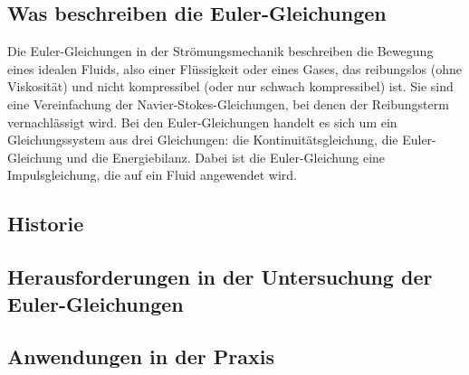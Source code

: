 \subsection{Was beschreiben die Euler-Gleichungen}

Die Euler-Gleichungen in der Strömungsmechanik beschreiben die Bewegung eines idealen Fluids, also einer Flüssigkeit oder eines Gases, das reibungslos (ohne Viskosität) und nicht kompressibel (oder nur schwach kompressibel) ist. Sie sind eine Vereinfachung der Navier-Stokes-Gleichungen, bei denen der Reibungsterm vernachlässigt wird. Bei den Euler-Gleichungen handelt es sich um ein Gleichungssystem aus drei Gleichungen: die Kontinuitätsgleichung, die Euler-Gleichung und die Energiebilanz. Dabei ist die Euler-Gleichung eine Impulsgleichung, die auf ein Fluid angewendet wird. 

\subsection{Historie}

\subsection{Herausforderungen in der Untersuchung der Euler-Gleichungen}

\subsection{Anwendungen in der Praxis}